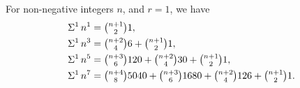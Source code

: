 \begin{example}
  For non-negative integers $n$, and $r=1$, we have
  \begin{align*}
    \Sigma^{1}\,{n}^{1} &= \tbinom{n+1}{2} 1, \\
    \Sigma^{1}\,{n}^{3} &= \tbinom{n+2}{4} 6    + \tbinom{n+1}{2} 1, \\
    \Sigma^{1}\,{n}^{5} &= \tbinom{n+3}{6} 120  + \tbinom{n+2}{4} 30   + \tbinom{n+1}{2} 1, \\
    \Sigma^{1}\,{n}^{7} &= \tbinom{n+4}{8} 5040 + \tbinom{n+3}{6} 1680 + \tbinom{n+2}{4} 126 + \tbinom{n+1}{2} 1.
  \end{align*}
\end{example}
